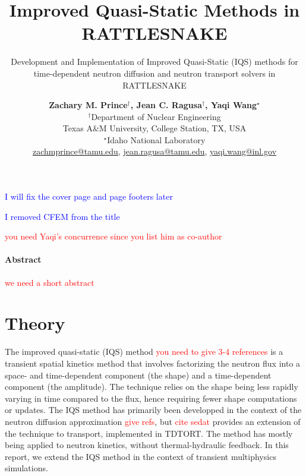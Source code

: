 \documentclass[12pt]{scrartcl}
\title{Improved Quasi-Static Methods in RATTLESNAKE}
\subtitle{Development and Implementation of Improved Quasi-Static (IQS) methods for time-dependent neutron diffusion and neutron transport solvers in RATTLESNAKE}
\author{ \normalsize
  \textbf{Zachary M. Prince$^\dagger$, Jean C. Ragusa$^\dagger$, Yaqi Wang$^\star$} \\
 \normalsize $^\dagger$Department of Nuclear Engineering \\
 \normalsize Texas A\&M University, College Station, TX, USA\\
 \normalsize $^\star$Idaho National Laboratory\\
 \normalsize \href{mailto:zachmprince@tamu.edu}{zachmprince@tamu.edu}, \href{jean.ragusa@tamu.edu}{jean.ragusa@tamu.edu}, \href{yaqi.wang@inl.gov}{yaqi.wang@inl.gov} 
}
\newcommand{\tcr}[1]{\textcolor{red}{#1}}
\newcommand{\tcb}[1]{\textcolor{blue}{#1}}
\begin{document}
\maketitle
{}

\tcb{I will fix the cover page and page footers later}

\tcb{I removed CFEM from the title}

\tcr{you need Yaqi's concurrence since you list him as co-author}

\paragraph*{Abstract}
\tcr{we need a short abstract}

\pagebreak

\section{Theory}

\par
The improved quasi-static (IQS) method \tcr{you need to give 3-4 references} is a transient spatial kinetics method that involves factorizing the neutron flux into a space- and time-dependent component (the shape) and a time-dependent component (the amplitude). The technique relies on the shape being less rapidly varying in time compared to the flux, hence
requiring fewer shape computations or updates. 
The IQS method has primarily been developped in the context of the neutron diffusion approximation \tcr{give refs}, but \tcr{cite sedat} provides an extension of the technique to transport, implemented in TDTORT. 
The method has mostly being applied to neutron kinetics, without thermal-hydraulic feedback. In this report, we extend the IQS
method in the context of transient multiphysics simulations.
\end{document}

